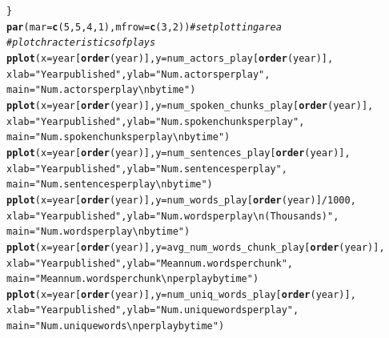 \documentclass{article}\usepackage[]{graphicx}\usepackage[]{color}
\makeatletter
\newcommand{\hlnum}[1]{\textcolor[rgb]{0.686,0.059,0.569}{#1}}%
\newcommand{\hlstr}[1]{\textcolor[rgb]{0.192,0.494,0.8}{#1}}%
\newcommand{\hlcom}[1]{\textcolor[rgb]{0.678,0.584,0.686}{\textit{#1}}}%
\newcommand{\hlopt}[1]{\textcolor[rgb]{0,0,0}{#1}}%
\newcommand{\hlstd}[1]{\textcolor[rgb]{0.345,0.345,0.345}{#1}}%
\newcommand{\hlkwc}[1]{\textcolor[rgb]{0.333,0.667,0.333}{#1}}%
\newcommand{\hlkwd}[1]{\textcolor[rgb]{0.737,0.353,0.396}{\textbf{#1}}}%
\newenvironment{kframe}{%
 \def\at@end@of@kframe{}%
 \ifinner\ifhmode%
  \def\at@end@of@kframe{\end{minipage}}%
  \begin{minipage}{\columnwidth}%
 \fi\fi%
 \def\FrameCommand##1{\hskip\@totalleftmargin \hskip-\fboxsep
 \colorbox{shadecolor}{##1}\hskip-\fboxsep
     \hskip-\linewidth \hskip-\@totalleftmargin \hskip\columnwidth}%
 \MakeFramed {\advance\hsize-\width
   \@totalleftmargin\z@ \linewidth\hsize
   \@setminipage}}%
 {\par\unskip\endMakeFramed%
 \at@end@of@kframe}
\newenvironment{knitrout}{}{} %
\makeatother
\begin{document}
\begin{knitrout}
\begin{kframe}
\begin{alltt}
\hlstd{\}}
\hlkwd{par}\hlstd{(}\hlkwc{mar} \hlstd{=} \hlkwd{c}\hlstd{(}\hlnum{5}\hlstd{,} \hlnum{5}\hlstd{,} \hlnum{4}\hlstd{,} \hlnum{1}\hlstd{),} \hlkwc{mfrow} \hlstd{=} \hlkwd{c}\hlstd{(}\hlnum{3}\hlstd{,} \hlnum{2}\hlstd{))} \hlcom{#set plotting area}
\hlcom{#plot chracteristics of plays}
\hlkwd{pplot}\hlstd{(}\hlkwc{x} \hlstd{= year[}\hlkwd{order}\hlstd{(year)],} \hlkwc{y} \hlstd{= num_actors_play[}\hlkwd{order}\hlstd{(year)],}
      \hlkwc{xlab} \hlstd{=} \hlstr{"Year published"}\hlstd{,} \hlkwc{ylab} \hlstd{=} \hlstr{"Num. actors per play"}\hlstd{,}
      \hlkwc{main} \hlstd{=} \hlstr{"Num. actors per play \textbackslash{}nby time"}\hlstd{)}
\hlkwd{pplot}\hlstd{(}\hlkwc{x} \hlstd{= year[}\hlkwd{order}\hlstd{(year)],} \hlkwc{y} \hlstd{= num_spoken_chunks_play[}\hlkwd{order}\hlstd{(year)],}
      \hlkwc{xlab} \hlstd{=} \hlstr{"Year published"}\hlstd{,} \hlkwc{ylab} \hlstd{=} \hlstr{"Num. spoken chunks per play"}\hlstd{,}
      \hlkwc{main} \hlstd{=} \hlstr{"Num. spoken chunks per play \textbackslash{}nby time"}\hlstd{)}
\hlkwd{pplot}\hlstd{(}\hlkwc{x} \hlstd{= year[}\hlkwd{order}\hlstd{(year)],} \hlkwc{y} \hlstd{= num_sentences_play[}\hlkwd{order}\hlstd{(year)],}
      \hlkwc{xlab} \hlstd{=} \hlstr{"Year published"}\hlstd{,} \hlkwc{ylab} \hlstd{=} \hlstr{"Num. sentences per play"}\hlstd{,}
      \hlkwc{main} \hlstd{=} \hlstr{"Num. sentences per play \textbackslash{}nby time"}\hlstd{)}
\hlkwd{pplot}\hlstd{(}\hlkwc{x} \hlstd{= year[}\hlkwd{order}\hlstd{(year)],} \hlkwc{y} \hlstd{= num_words_play[}\hlkwd{order}\hlstd{(year)]}\hlopt{/}\hlnum{1000}\hlstd{,}
      \hlkwc{xlab} \hlstd{=} \hlstr{"Year published"}\hlstd{,} \hlkwc{ylab} \hlstd{=} \hlstr{"Num. words per play \textbackslash{}n (Thousands)"}\hlstd{,}
      \hlkwc{main} \hlstd{=} \hlstr{"Num. words per play \textbackslash{}nby time"}\hlstd{)}
\hlkwd{pplot}\hlstd{(}\hlkwc{x} \hlstd{= year[}\hlkwd{order}\hlstd{(year)],} \hlkwc{y} \hlstd{= avg_num_words_chunk_play[}\hlkwd{order}\hlstd{(year)],}
      \hlkwc{xlab} \hlstd{=} \hlstr{"Year published"}\hlstd{,} \hlkwc{ylab} \hlstd{=} \hlstr{"Mean num. words per chunk"}\hlstd{,}
      \hlkwc{main} \hlstd{=} \hlstr{"Mean num. words per chunk \textbackslash{}nper play by time"}\hlstd{)}
\hlkwd{pplot}\hlstd{(}\hlkwc{x} \hlstd{= year[}\hlkwd{order}\hlstd{(year)],} \hlkwc{y} \hlstd{= num_uniq_words_play[}\hlkwd{order}\hlstd{(year)],}
      \hlkwc{xlab} \hlstd{=} \hlstr{"Year published"}\hlstd{,} \hlkwc{ylab} \hlstd{=} \hlstr{"Num. unique words per play"}\hlstd{,}
      \hlkwc{main} \hlstd{=} \hlstr{"Num. unique words \textbackslash{}nper play by time"}\hlstd{)}

\end{alltt}
\end{kframe}
\end{knitrout}
\end{document}

